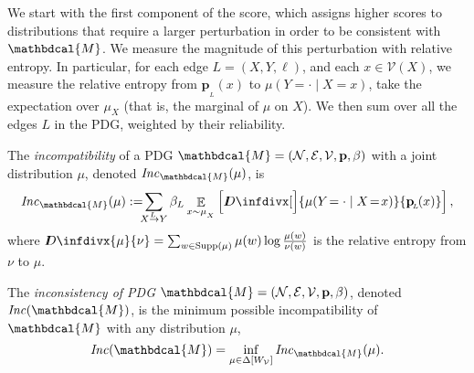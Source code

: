 \documentclass{article}
\theoremstyle{plain}
\theoremstyle{definition}
\theoremstyle{remark}
\newcommand{\thickD}{I\mkern-8muD}
\newcommand{\kldiv}{\thickD\infdivx}
\DeclareMathOperator*{\E}{\mathbb{E}} %
\newcommand\mat[1]{\mathbf{#1}}
\def\sheq{\!=\!}
\newcommand{\bp}[1][L]{\mat{p}_{\!_{#1}\!}}
\newcommand{\V}{\mathcal V}
\newcommand{\N}{\mathcal N}
\newcommand{\Ed}{\mathcal E}
\newcommand{\pdgvars}[1][]{(\N#1, \Ed#1, \V#1, \mat p#1, \beta#1)}
\newcommand{\dg}[1]{\mathbdcal{#1}}
\newcommand\Inc{\mathit{Inc}}
\newcommand{\ed}[3]{#2
  \overset{\smash{\mskip-5mu\raisebox{-1pt}{$\scriptscriptstyle
        #1$}}}{\rightarrow} #3}
\newcommand{\alle}[1][L]{_{ \ed {#1}XY}}
\numberwithin{equation}{section}
\begin{document}
We start with the first component of the score, which assigns higher scores to distributions that require a larger perturbation in order to be consistent with $\dg M$.  
We measure the magnitude of this perturbation with relative entropy. In particular, for each edge $L = (X,Y, \ell)$, and each $x \in \V(X)$, we measure the relative entropy from $\bp(x)$ to $\mu(Y \!= \cdot\mid X=x)$, take the expectation over $\mu_X$ (that is, the marginal of $\mu$ on $X$). We then sum over all the edges $L$ in the PDG, weighted by their reliability.


\begin{defn}\label{def:inc}
	The \emph{incompatibility} of a PDG $\dg M = \pdgvars[]$ with
	a joint distribution $\mu$, denoted $\Inc_{\dg M}(\mu)$, is  
    \[
	\Inc_{\dg M }( \mu) := 
		\!\!\!\sum \alle \beta_L \E_{x \sim \mu_{_X}}
            \left[\kldiv[\Big]{ \mu(Y\!= \cdot\mid X \sheq x) }{\bp(x) } \right] ,
	\]
	where $\kldiv{\mu}{\nu} = \sum_{w \in \text{Supp($\mu$)}} \mu(w) \log\frac{\mu(w)}{\nu(w)}$ is the 
	relative entropy from $\nu$ to $\mu$.
\begin{vfull}
The \emph{inconsistency of PDG $\dg M = \pdgvars[]$}, 
       denoted $\Inc(\dg M)$, is the
minimum possible incompatibility of $\dg M$ with any
distribution $\mu$,  
	\[ \Inc(\dg M) = \inf_{ \mu \in \Delta [W_{\cal V}]} \Inc_{\dg M}(\mu) . \]
\end{vfull}
\end{defn}
\end{document}
